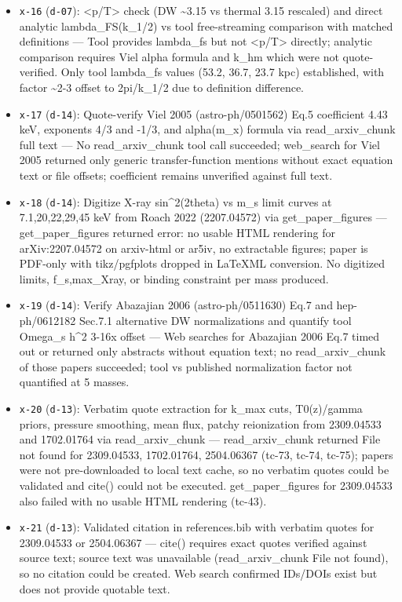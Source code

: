 \documentclass[11pt,a4paper]{article}
\begin{document}
\begin{itemize}
  \item \texttt{x-16} (\texttt{d-07}): \textless{}p/T\textgreater{} check (DW \textasciitilde{}3.15 vs thermal 3.15 rescaled) and direct analytic lambda\_FS(k\_1/2) vs tool free-streaming comparison with matched definitions --- Tool provides lambda\_fs but not \textless{}p/T\textgreater{} directly; analytic comparison requires Viel alpha formula and k\_hm which were not quote-verified. Only tool lambda\_fs values (53.2, 36.7, 23.7 kpc) established, with factor \textasciitilde{}2-3 offset to 2pi/k\_1/2 due to definition difference.
  \item \texttt{x-17} (\texttt{d-14}): Quote-verify Viel 2005 (astro-ph/0501562) Eq.5 coefficient 4.43 keV, exponents 4/3 and -1/3, and alpha(m\_x) formula via read\_arxiv\_chunk full text --- No read\_arxiv\_chunk tool call succeeded; web\_search for Viel 2005 returned only generic transfer-function mentions without exact equation text or file offsets; coefficient remains unverified against full text.
  \item \texttt{x-18} (\texttt{d-14}): Digitize X-ray sin\textasciicircum{}2(2theta) vs m\_s limit curves at 7.1,20,22,29,45 keV from Roach 2022 (2207.04572) via get\_paper\_figures --- get\_paper\_figures returned error: no usable HTML rendering for arXiv:2207.04572 on arxiv-html or ar5iv, no extractable figures; paper is PDF-only with tikz/pgfplots dropped in LaTeXML conversion. No digitized limits, f\_s,max\_Xray, or binding constraint per mass produced.
  \item \texttt{x-19} (\texttt{d-14}): Verify Abazajian 2006 (astro-ph/0511630) Eq.7 and hep-ph/0612182 Sec.7.1 alternative DW normalizations and quantify tool Omega\_s h\textasciicircum{}2 3-16x offset --- Web searches for Abazajian 2006 Eq.7 timed out or returned only abstracts without equation text; no read\_arxiv\_chunk of those papers succeeded; tool vs published normalization factor not quantified at 5 masses.
  \item \texttt{x-20} (\texttt{d-13}): Verbatim quote extraction for k\_max cuts, T0(z)/gamma priors, pressure smoothing, mean flux, patchy reionization from 2309.04533 and 1702.01764 via read\_arxiv\_chunk --- read\_arxiv\_chunk returned File not found for 2309.04533, 1702.01764, 2504.06367 (tc-73, tc-74, tc-75); papers were not pre-downloaded to local text cache, so no verbatim quotes could be validated and cite() could not be executed. get\_paper\_figures for 2309.04533 also failed with no usable HTML rendering (tc-43).
  \item \texttt{x-21} (\texttt{d-13}): Validated citation in references.bib with verbatim quotes for 2309.04533 or 2504.06367 --- cite() requires exact quotes verified against source text; source text was unavailable (read\_arxiv\_chunk File not found), so no citation could be created. Web search confirmed IDs/DOIs exist but does not provide quotable text.

\end{itemize}
\end{document}
